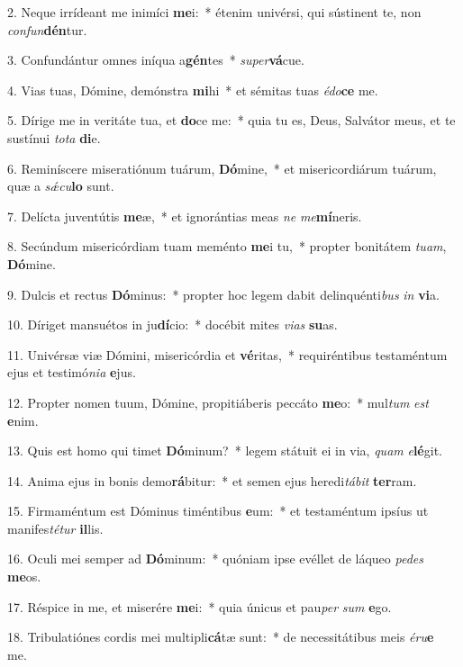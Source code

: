 2. Neque irrídeant me inimíci \textbf{me}i:~*  étenim univérsi, qui sústinent te, non \textit{con}\textit{fun}\textbf{dén}tur.\

3. Confundántur omnes iníqua a\textbf{gén}tes~*  \textit{su}\textit{per}\textbf{vá}cue.\

4. Vias tuas, Dómine, demónstra \textbf{mi}hi~*  et sémitas tuas \textit{é}\textit{do}\textbf{ce} me.\

5. Dírige me in veritáte tua, et \textbf{do}ce me:~*  quia tu es, Deus, Salvátor meus, et te sustínui \textit{to}\textit{ta} \textbf{di}e.\

6. Reminíscere miseratiónum tuárum, \textbf{Dó}mine,~*  et misericordiárum tuárum, quæ a \textit{sǽ}\textit{cu}\textbf{lo} sunt.\

7. Delícta juventútis \textbf{me}æ,~*  et ignorántias meas \textit{ne} \textit{me}\textbf{mí}neris.\

8. Secúndum misericórdiam tuam meménto \textbf{me}i tu,~*  propter bonitátem \textit{tu}\textit{am}, \textbf{Dó}mine.\

9. Dulcis et rectus \textbf{Dó}minus:~*  propter hoc legem dabit delinquénti\textit{bus} \textit{in} \textbf{vi}a.\

10. Díriget mansuétos in ju\textbf{dí}cio:~*  docébit mites \textit{vi}\textit{as} \textbf{su}as.\

11. Univérsæ viæ Dómini, misericórdia et \textbf{vé}ritas,~*  requiréntibus testaméntum ejus et testimó\textit{ni}\textit{a} \textbf{e}jus.\

12. Propter nomen tuum, Dómine, propitiáberis peccáto \textbf{me}o:~*  mul\textit{tum} \textit{est} \textbf{e}nim.\

13. Quis est homo qui timet \textbf{Dó}minum?~*  legem státuit ei in via, \textit{quam} \textit{e}\textbf{lé}git.\

14. Anima ejus in bonis demo\textbf{rá}bitur:~*  et semen ejus heredi\textit{tá}\textit{bit} \textbf{ter}ram.\

15. Firmaméntum est Dóminus timéntibus \textbf{e}um:~*  et testaméntum ipsíus ut manifes\textit{té}\textit{tur} \textbf{il}lis.\

16. Oculi mei semper ad \textbf{Dó}minum:~*  quóniam ipse evéllet de láqueo \textit{pe}\textit{des} \textbf{me}os.\

17. Réspice in me, et miserére \textbf{me}i:~*  quia únicus et pau\textit{per} \textit{sum} \textbf{e}go.\

18. Tribulatiónes cordis mei multipli\textbf{cá}tæ sunt:~*  de necessitátibus meis \textit{é}\textit{ru}\textbf{e} me.\

